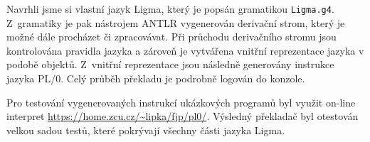 \documentclass[czech, oth, kiv, he, iso690numb, viewonly]{fasthesis}
\begin{document}
    Navrhli jsme si vlastní jazyk Ligma, který je popsán gramatikou \texttt{Ligma.g4}.
    Z~gramatiky je pak nástrojem ANTLR vygenerován derivační strom, který je možné dále procházet či zpracovávat.
    Při průchodu derivačního stromu jsou kontrolována pravidla jazyka a zároveň je vytvářena vnitřní reprezentace jazyka v podobě objektů.
    Z~vnitřní reprezentace jsou následně generovány instrukce jazyka PL/0.
    Celý průběh překladu je podrobně logován do konzole.
    
    Pro testování vygenerovaných instrukcí ukázkových programů byl využit on-line interpret \url{https://home.zcu.cz/~lipka/fjp/pl0/}.
    Výsledný překladač byl otestován velkou sadou testů, které pokrývají všechny části jazyka Ligma.

    \appendix

    \printbibliography
        
    \backmatter
    \listoffigures
\end{document}
